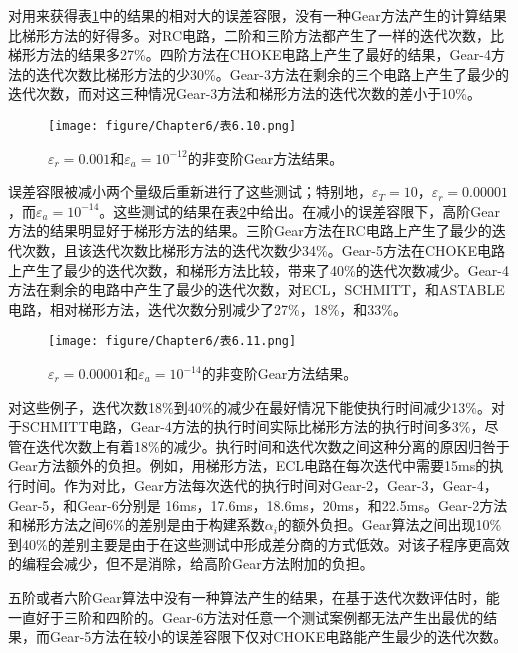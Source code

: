 对用来获得表\ref{表6.10}中的结果的相对大的误差容限，没有一种Gear方法产生的计算结果比梯形方法的好得多。对RC电路，二阶和三阶方法都产生了一样的迭代次数，比梯形方法的结果多27\%。四阶方法在CHOKE电路上产生了最好的结果，Gear-4方法的迭代次数比梯形方法的少30\%。Gear-3方法在剩余的三个电路上产生了最少的迭代次数，而对这三种情况Gear-3方法和梯形方法的迭代次数的差小于10\%。

\begin{figure}[htbp]
\small
    \centering
    \texttt{[image: figure/Chapter6/表6.10.png]}
    \caption{$\varepsilon_r = 0.001$和$\varepsilon_a = 10^{-12}$的非变阶Gear方法结果。}
    \label{表6.10}
\end{figure}

误差容限被减小两个量级后重新进行了这些测试；特别地，$\varepsilon_T=10$，$\varepsilon_r = 0.00001$，而$\varepsilon_a = 10^{-14}$。这些测试的结果在表\ref{表6.11}中给出。在减小的误差容限下，高阶Gear方法的结果明显好于梯形方法的结果。三阶Gear方法在RC电路上产生了最少的迭代次数，且该迭代次数比梯形方法的迭代次数少34\%。Gear-5方法在CHOKE电路上产生了最少的迭代次数，和梯形方法比较，带来了40\%的迭代次数减少。Gear-4方法在剩余的电路中产生了最少的迭代次数，对ECL，SCHMITT，和ASTABLE电路，相对梯形方法，迭代次数分别减少了27\%，18\%，和33\%。

\begin{figure}[htbp]
\small
    \centering
    \texttt{[image: figure/Chapter6/表6.11.png]}
    \caption{$\varepsilon_r = 0.00001$和$\varepsilon_a = 10^{-14}$的非变阶Gear方法结果。}
    \label{表6.11}
\end{figure}

对这些例子，迭代次数18\%到40\%的减少在最好情况下能使执行时间减少13\%。对于SCHMITT电路，Gear-4方法的执行时间实际比梯形方法的执行时间多3\%，尽管在迭代次数上有着18\%的减少。执行时间和迭代次数之间这种分离的原因归咎于Gear方法额外的负担。例如，用梯形方法，ECL电路在每次迭代中需要15ms的执行时间。作为对比，Gear方法每次迭代的执行时间对Gear-2，Gear-3，Gear-4，Gear-5，和Gear-6分别是
16ms，17.6ms，18.6ms，20ms，和22.5ms。Gear-2方法和梯形方法之间6\%的差别是由于构建系数$\alpha_i$的额外负担。Gear算法之间出现10\%到40\%的差别主要是由于在这些测试中形成差分商的方式低效。对该子程序更高效的编程会减少，但不是消除，给高阶Gear方法附加的负担。

五阶或者六阶Gear算法中没有一种算法产生的结果，在基于迭代次数评估时，能一直好于三阶和四阶的。Gear-6方法对任意一个测试案例都无法产生出最优的结果，而Gear-5方法在较小的误差容限下仅对CHOKE电路能产生最少的迭代次数。

